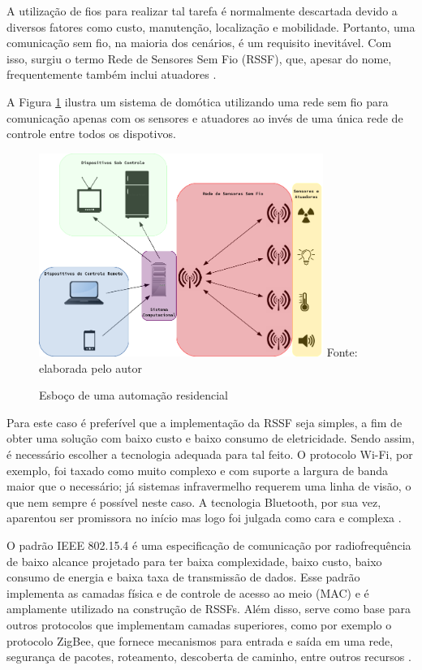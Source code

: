 A utilização de fios para realizar tal tarefa é normalmente descartada devido a diversos fatores como custo,
manutenção, localização e mobilidade. Portanto, uma comunicação sem fio, na maioria dos cenários, é um
requisito inevitável. Com isso, surgiu o termo Rede de Sensores Sem Fio (RSSF), que, apesar do nome,
frequentemente também inclui atuadores \cite{karl_willig2005}.

A Figura \ref{figura:wsn} ilustra um sistema de domótica utilizando uma rede sem fio para comunicação apenas
com os sensores e atuadores ao invés de uma única rede de controle entre todos os dispotivos.

\begin{figure}[h]
	\centering
	\caption{Esboço de uma automação residencial}
	\includegraphics[width=350]{../images/wsn.png}
	\hspace{\linewidth}
	Fonte: elaborada pelo autor
	\label{figura:wsn}
\end{figure}

Para este caso é preferível que a implementação da RSSF seja simples, a fim de obter uma solução com baixo
custo e baixo consumo de eletricidade. Sendo assim, é necessário escolher a tecnologia adequada para tal
feito. O protocolo Wi-Fi, por exemplo, foi taxado como muito complexo e com suporte a largura de banda maior
que o necessário; já sistemas infravermelho requerem uma linha de visão, o que nem sempre é possível neste
caso. A tecnologia Bluetooth, por sua vez, aparentou ser promissora no início mas logo foi julgada como cara e
complexa \cite{sohraby_minoli_znati2007}.

O padrão IEEE 802.15.4 é uma especificação de comunicação por radiofrequência de baixo alcance projetado para
ter baixa complexidade, baixo custo, baixo consumo de energia e baixa taxa de transmissão de dados. Esse
padrão implementa as camadas física e de controle de acesso ao meio (MAC) e é amplamente utilizado na construção de
RSSFs. Além disso, serve como base para outros protocolos que implementam camadas superiores, como por exemplo
o protocolo ZigBee, que fornece mecanismos para entrada e saída em uma rede, segurança de pacotes, roteamento,
descoberta de caminho, entre outros recursos \cite{buratti2011}.

